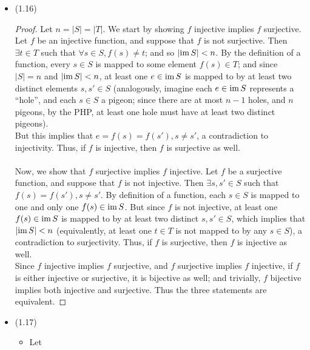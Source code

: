 \documentclass{homework}
\begin{document}
\begin{solution}
  \begin{itemize}
    \item (1.16)
      \begin{proof}[Proof]
        Let $n=\left| S \right| =\left| T \right| $. We start by showing $f$ injective implies $f$
        surjective. Let $f$ be an injective function, and suppose that $f$ is not surjective. Then
        $\exists t\in T$ such that $\forall s \in S, f(s)\neq t$; and so $\left|\operatorname{im} S\right|<n$.
        By the definition of a function, every $s \in S$ is mapped to some element $f(s)\in T$; and
        since $\left| S \right| = n$ and $\left| \operatorname{im} S\right|<n$, at least one $e\in \operatorname{im} S$ is
        mapped to by at least two distinct elements $s,s'\in S$ (analogously, imagine each $e\in \operatorname{im}
        S$ represents a ``hole'', and each $s \in S$ a pigeon; since there are at most $n-1$ holes,
        and $n$ pigeons, by the PHP, at least one hole must have at least two distinct pigeons). \\
        But this implies that $e=f(s)=f(s'), s\neq s'$, a contradiction to injectivity. Thus, if $f$
        is injective, then $f$ is surjective as well.
        \\ \\
        Now, we show that $f$ surjective implies $f$ injective. Let $f$ be a surjective function, 
        and suppose that $f$ is not injective. Then $ \exists s,s'\in S$ such that $f(s)=f(s'),
        s\neq s'$. By definition of a function, each $s \in S$ is mapped to one and only one
        $f(s)\in \operatorname{im} S$. But since $f$ is not injective, at least one $f(s) \in \operatorname{im} S$ is
        mapped to by at least two distinct $s,s'\in S$, which implies that $\left| \operatorname{im} S \right|
        < n$ (equivalently, at least one $t\in T$ is not mapped to by any $s \in S$), a contradiction
        to surjectivity. Thus, if $f$ is surjective, then $f$ is injective as well.
        \\
        Since $f$ injective implies $f$ surjective, and $f$ surjective implies $f$ injective, if
        $f$ is either injective or surjective, it is bijective as well; and trivially, $f$ bijective
        implies both injective and surjective. Thus the three statements are equivalent.
      \end{proof}
    \item (1.17)
      \begin{itemize}
        \item Let \begin{align*}

\end{align*}
\end{itemize}
\end{itemize}
\end{solution}
\end{document}
